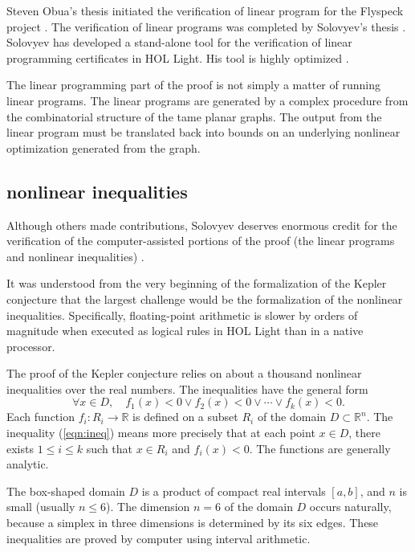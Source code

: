 \documentclass{amsart}
\newcommand{\ring}[1]{\mathbb{#1}}
\begin{document}
Steven Obua's thesis initiated the verification of linear program for
the Flyspeck project
\cite{DBLP:conf/tphol/Obua05}\cite{DBLP:journals/amai/ObuaN09}.  The
verification of linear programs was completed by Solovyev's thesis
\cite{solovyev2013formal}.  Solovyev has developed a stand-alone tool
for the verification of linear programming certificates in HOL Light.
His tool is highly optimized \cite{solovyev2011efficient}.

The linear programming part of the proof is not simply a matter of
running linear programs.  The linear programs are generated by a
complex procedure from the combinatorial structure of the tame planar
graphs.  The output from the linear program must be translated back
into bounds on an underlying nonlinear optimization generated from the
graph.

\subsection{nonlinear inequalities}
Although others made contributions, Solovyev deserves enormous credit
for the verification of the computer-assisted portions of the proof
(the linear programs and nonlinear inequalities)
\cite{solovyev2013formal}.

It was understood from the very beginning of the formalization of the
Kepler conjecture that the largest challenge would be the
formalization of the nonlinear inequalities.  Specifically,
floating-point arithmetic is slower by orders of magnitude when
executed as logical rules in HOL Light than in a native processor.

The proof of the Kepler conjecture relies on about a thousand
nonlinear inequalities over the real numbers.  The inequalities
have the general form 
\begin{equation}\label{eqn:ineq}
\forall x \in D,\quad f_1(x) < 0 \lor f_2(x) < 0 \lor \cdots \lor f_k(x) < 0.
\end{equation}
Each function $f_i : R_i \to \ring{R}$ is defined on a subset $R_i$ of the
domain $D\subset \ring{R}^n$.
The inequality (\ref{eqn:ineq}) means more precisely that 
at each point $x\in D$, there exists $1\le i\le k$ such that
$x \in R_i$ and $f_i(x) < 0$.  The functions are generally analytic.

The box-shaped domain $D$ is a product of compact real intervals
$[a,b]$, and $n$ is small (usually $n\le 6$).  The dimension $n=6$ of
the domain $D$ occurs naturally, because a simplex in three dimensions
is determined by its six edges.  These inequalities are proved by
computer using interval arithmetic.
\end{document}
